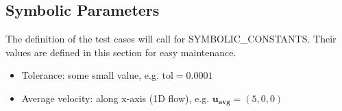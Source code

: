 \documentclass[12pt, titlepage]{article}
\begin{document}

\subsection{Symbolic Parameters}

The definition of the test cases will call for SYMBOLIC\_CONSTANTS.
Their values are defined in this section for easy maintenance.

\begin{itemize}
  \item Tolerance: some small value, e.g. $\text{tol}=0.0001$
  \item Average velocity: along x-axis (1D flow), e.g. $\mathbf{u_{avg}}=(5,0,0)$
\end{itemize}









\end{document}
